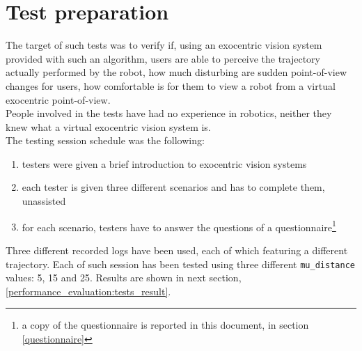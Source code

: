 \section{Test preparation}
\label{performance_evaluation:testpreparation}

The target of such tests was to verify  if, using 
an exocentric vision system provided with such an algorithm, 
users are able to perceive the trajectory actually 
performed by the robot,  how much disturbing are 
sudden point-of-view changes for users,  how 
comfortable is for them to view a robot from a 
virtual exocentric point-of-view.
\\
People involved in the tests have had no experience in 
robotics, neither they knew what a virtual exocentric 
vision system is.
\\
The testing session schedule was the following:
\begin{enumerate}
  \item testers were given a brief introduction to exocentric vision systems
  \item each tester is given three different scenarios and has to 
    complete them, unassisted
  \item for each scenario, testers have to answer the questions 
    of a questionnaire\footnote{a copy of the questionnaire is 
      reported in this document, in section \ref{questionnaire}}
\end{enumerate}

Three different recorded logs have been used, each of which featuring 
a different trajectory. Each of such session has been tested
using three different \texttt{mu\_distance} values: 5, 15 and 25.
Results are shown in next section,
\ref{performance_evaluation:tests_result}.
